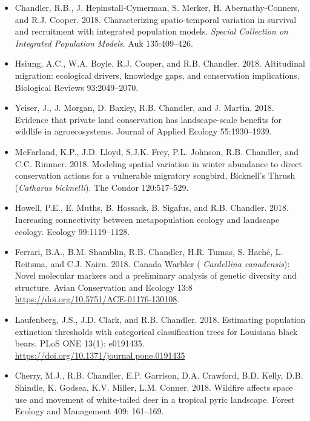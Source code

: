 \begin{itemize}
\item Chandler, R.B., J. Hepinstall-Cymerman, S. Merker, H. Abernathy-Conners,
  and R.J. Cooper. 2018. Characterizing spatio-temporal 
  variation in survival and recruitment with integrated population
  models. {\it Special Collection on Integrated Population
    Models}. Auk 135:409--426. 

\item Hsiung, A.C., W.A. Boyle, R.J. Cooper, and
  R.B. Chandler. 2018. Altitudinal migration: ecological drivers,
  knowledge gaps, and conservation implications. Biological Reviews 
  93:2049--2070. 

\item Yeiser, J., J. Morgan, D. Baxley, R.B. Chandler, and
  J. Martin. 2018. Evidence that private land conservation
  has landscape-scale benefits for wildlife in agroecosystems. Journal
  of Applied Ecology 55:1930--1939. 

\item McFarland, K.P., J.D. Lloyd, S.J.K. Frey, P.L. Johnson,
  R.B. Chandler, and C.C. Rimmer. 2018. Modeling spatial
  variation in winter abundance to direct conservation actions for a
  vulnerable migratory songbird, Bicknell’s Thrush ({\it Catharus
    bicknelli}). The Condor 120:517--529. 

\item Howell, P.E., E. Muths, B. Hossack, B. Sigafus, and
  R.B. Chandler. 2018. Increasing connectivity between 
  metapopulation ecology and landscape ecology. Ecology 99:1119--1128.  
  
\item Ferrari, B.A., B.M. Shamblin, R.B. Chandler, H.R. Tumas, S. Hach\'e,
  L. Reitsma, and C.J. Nairn. 2018. Canada Warbler ({\it
  Cardellina canadensis}): Novel molecular markers and a preliminary
  analysis of genetic diversity and structure. Avian Conservation and
  Ecology 13:8 \url{https://doi.org/10.5751/ACE-01176-130108}.

\item Laufenberg, J.S., J.D. Clark, and
  R.B. Chandler. 2018. Estimating population extinction thresholds 
  with categorical classification trees for Louisiana black
  bears. PLoS ONE 13(1): e0191435.
  \url{https://doi.org/10.1371/journal.pone.0191435}

\item Cherry, M.J., R.B. Chandler, E.P. Garrison, D.A. Crawford,
  B.D. Kelly, D.B. Shindle, K. Godsea, K.V. Miller,
  L.M. Conner. 2018. Wildfire affects space use and movement of
  white-tailed deer in a tropical pyric landscape. Forest Ecology and
  Management 409: 161--169. 


\end{itemize}
